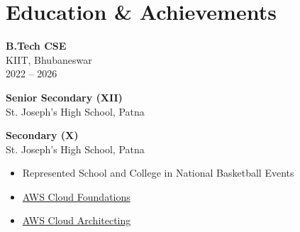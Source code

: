 \documentclass[a4paper,10pt]{article}
\begin{document}
\section*{Education \& Achievements}
\begin{multicols}{2}
\textbf{B.Tech CSE} \\
KIIT, Bhubaneswar \\
2022 – 2026

\vspace{0.3em}
\textbf{Senior Secondary (XII)} \\
St. Joseph’s High School, Patna

\vspace{0.3em}
\textbf{Secondary (X)} \\
St. Joseph’s High School, Patna

\columnbreak

\begin{itemize}[leftmargin=1em, itemsep=0.3em]
    \item {Represented School and College in National Basketball Events}
    \item \href{https://www.credly.com/badges/4e904b52-e5d0-4a34-8ba2-a0fd863d9b9b/print}{AWS Cloud Foundations}
    \item \href{https://www.credly.com/badges/7ae8b6ab-d30e-4a75-8c1b-9c3b4673bb30/print}{AWS Cloud Architecting}
\end{itemize}
\end{multicols}
\end{document}
